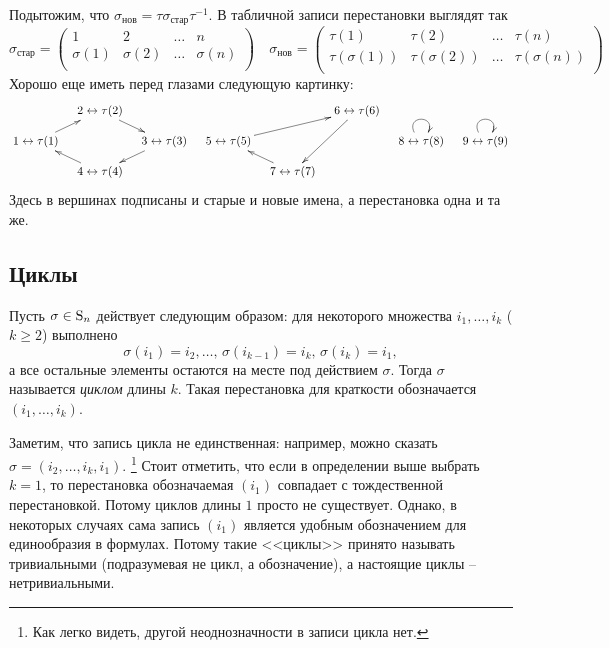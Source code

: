 Подытожим, что $\sigma_\text{нов}=\tau\sigma_\text{стар}\tau^{-1}$.
В табличной записи перестановки выглядят так
\[
\sigma_\text{стар} = 
\begin{pmatrix}
{1}&{2}&{\ldots}&{n}\\
{\sigma(1)}&{\sigma(2)}&{\ldots}&{\sigma(n)}\\
\end{pmatrix}\quad
\sigma_\text{нов} = 
\begin{pmatrix}
{\tau(1)}&{\tau(2)}&{\ldots}&{\tau(n)}\\
{\tau(\sigma(1))}&{\tau(\sigma(2))}&{\ldots}&{\tau(\sigma(n))}\\
\end{pmatrix}
\]
Хорошо еще иметь перед глазами следующую картинку:
\[
\xymatrix@R=10pt@C=10pt{
	{}&{2\leftrightarrow\tau(2)}\ar[dr]&{}&{}&{}&{6\leftrightarrow\tau(6)}\ar[ddl]&{}&{}\\
	{1\leftrightarrow\tau(1)}\ar[ur]&{}&{3\leftrightarrow\tau(3)}\ar[dl]&{5\leftrightarrow\tau(5)}\ar[urr]&{}&{}&{8\leftrightarrow\tau(8)}\ar@(ul,ur)&{9\leftrightarrow\tau(9)}\ar@(ul,ur)\\
	{}&{4\leftrightarrow\tau(4)}\ar[ul]&{}&{}&{7\leftrightarrow\tau(7)}\ar[ul]&{}&{}&{}\\
}
\]
Здесь в вершинах подписаны и старые и новые имена, а перестановка одна и та же.

\subsection{Циклы}

\begin{definition}
\label{def::cycle}
Пусть $\sigma\in \operatorname{S}_{n}$ действует следующим образом: для некоторого множества $i_1,\ldots,i_k$ ($k\geqslant 2$) выполнено 
\[
\sigma(i_1) = i_2,\ldots,\,\sigma(i_{k-1}) = i_k,\,\sigma(i_k) = i_1,
\]
а все остальные элементы остаются на месте под действием $\sigma$.
Тогда $\sigma$ называется {\it циклом} длины $k$.
Такая перестановка для краткости обозначается $(i_1,\ldots,i_k)$.
\end{definition}
Заметим, что запись цикла не единственная: например, можно сказать $\sigma = (i_2,\ldots,i_k,i_1)$.%
\footnote{Как легко видеть, другой неоднозначности в записи цикла нет.}
Стоит отметить, что если в определении выше выбрать $k=1$, то перестановка обозначаемая $(i_1)$ совпадает с тождественной перестановкой.
Потому циклов длины $1$ просто не существует.
Однако, в некоторых случаях сама запись $(i_1)$ является удобным обозначением для единообразия в формулах.
Потому такие <<циклы>> принято называть тривиальными (подразумевая не цикл, а обозначение), а настоящие циклы -- нетривиальными.

